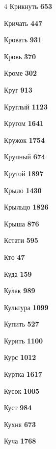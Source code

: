 \begin{multicols}{4}
\noindent Крикнуть \dotfill \textbf{\color{secondary} 653}\par
\noindent Кричать \dotfill \textbf{\color{secondary} 447}\par
\noindent Кровать \dotfill \textbf{\color{secondary} 931}\par
\noindent Кровь \dotfill \textbf{\color{secondary} 370}\par
\noindent Кроме \dotfill \textbf{\color{secondary} 302}\par
\noindent Круг \dotfill \textbf{\color{secondary} 913}\par
\noindent Круглый \dotfill \textbf{\color{secondary} 1123}\par
\noindent Кругом \dotfill \textbf{\color{secondary} 1641}\par
\noindent Кружок \dotfill \textbf{\color{secondary} 1754}\par
\noindent Крупный \dotfill \textbf{\color{secondary} 674}\par
\noindent Крутой \dotfill \textbf{\color{secondary} 1897}\par
\noindent Крыло \dotfill \textbf{\color{secondary} 1430}\par
\noindent Крыльцо \dotfill \textbf{\color{secondary} 1826}\par
\noindent Крыша \dotfill \textbf{\color{secondary} 876}\par
\noindent Кстати \dotfill \textbf{\color{secondary} 595}\par
\noindent Кто \dotfill \textbf{\color{secondary} 47}\par
\noindent Куда \dotfill \textbf{\color{secondary} 159}\par
\noindent Кулак \dotfill \textbf{\color{secondary} 989}\par
\noindent Культура \dotfill \textbf{\color{secondary} 1099}\par
\noindent Купить \dotfill \textbf{\color{secondary} 527}\par
\noindent Курить \dotfill \textbf{\color{secondary} 1100}\par
\noindent Курс \dotfill \textbf{\color{secondary} 1012}\par
\noindent Куртка \dotfill \textbf{\color{secondary} 1617}\par
\noindent Кусок \dotfill \textbf{\color{secondary} 1005}\par
\noindent Куст \dotfill \textbf{\color{secondary} 984}\par
\noindent Кухня \dotfill \textbf{\color{secondary} 673}\par
\noindent Куча \dotfill \textbf{\color{secondary} 1768}\par


\end{multicols}
